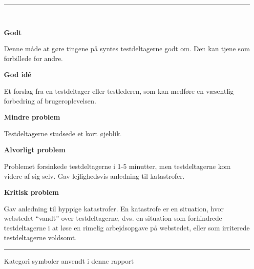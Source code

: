 \documentclass[10pt,a4paper]{article}      %
\newcommand\pic[1]{\texttt{[image: Pics/\#1]}}
\renewcommand\good{\pic{good}}
\renewcommand\goodidea{\pic{goodidea}}
\renewcommand\smallproblem{\pic{smallproblem}}
\renewcommand\seriousproblem{\pic{seriousproblem}}
\renewcommand\criticalproblem{\pic{criticalproblem}}
\begin{document}
\begin{table}[!ht]
\centering
\rule{\linewidth}{\heavyrulewidth}\\[6mm]
\begin{kommentarer}

\item[\good] \textbf{Godt}

Denne måde at gøre tingene på syntes testdeltagerne godt om. Den kan tjene som forbillede for
andre.

\item[\goodidea] \textbf{God idé}

Et forslag fra en testdeltager eller testlederen, som kan medføre en væsentlig forbedring af
brugeroplevelsen.

\item[\smallproblem] \textbf{Mindre problem}

Testdeltagerne studsede et kort øjeblik.

\item[\seriousproblem] \textbf{Alvorligt problem}

Problemet forsinkede testdeltagerne i 1-5 minutter, men testdeltagerne kom videre af sig selv.
Gav lejlighedsvis anledning til katastrofer.

\item[\criticalproblem] \textbf{Kritisk problem}

Gav anledning til hyppige katastrofer. En katastrofe er en situation, hvor webstedet ``vandt''
over testdeltagerne, dvs. en situation som forhindrede testdeltagerne i at løse en rimelig
arbejdsopgave på webstedet, eller som irriterede testdeltagerne voldsomt.

\end{kommentarer}
\rule{\linewidth}{\heavyrulewidth}
\caption{Kategori symboler anvendt i denne rapport}
\label{tab:gt}
\end{table}%
\clearpage
\end{document}

